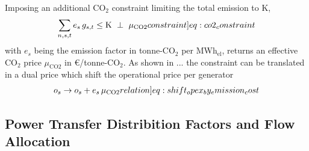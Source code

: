 \documentclass[11pt,twocolumn]{article}
\newcommand{\resultsin}[1]{\hspace{6pt} \bot  \hspace{6pt} #1}
\newcommand{\Forall}[1]{\hspace{10pt} \forall \,\, #1 }
\newcommand{\generation}{g_{s,t}}
\newcommand{\capacityGeneration}{G_{s}}
\newcommand{\capexGeneration}{c_{s}}
\newcommand{\opexGeneration}{o_{s}}
\newcommand{\lmp}[1][n]{\lambda_{#1,t}}
\newcommand{\emission}{e_{s}}
\newcommand{\emissionPrice}{\mu_{\text{CO2}}}
\newcommand{\megawatthour}{MWh$_\text{el}$}
\begin{document}
Imposing an additional CO$_2$ constraint limiting the total emission to K,  
\begin{align}
\sum_{n,s,t} \emission \, \generation \le \text{K} \resultsin{\emissionPrice} 
\label[constraint]{eq:co2_constraint}
\end{align}
with $\emission$ being the emission factor in tonne-CO$_2$ per \megawatthour, returns an effective CO$_2$ price $\emissionPrice$ in \euro/tonne-CO$_2$. 
% 
As shown in ... the constraint can be translated in a dual price which shift the operational price per generator
\begin{align}
\opexGeneration \rightarrow \opexGeneration + \emission \, \emissionPrice \label[relation]{eq:shift_opex_by_emission_cost}
\end{align}


\subsection{Power Transfer Distribition Factors and Flow Allocation}
\label{sec:ptdf_and_flow_allocation}
\end{document}
